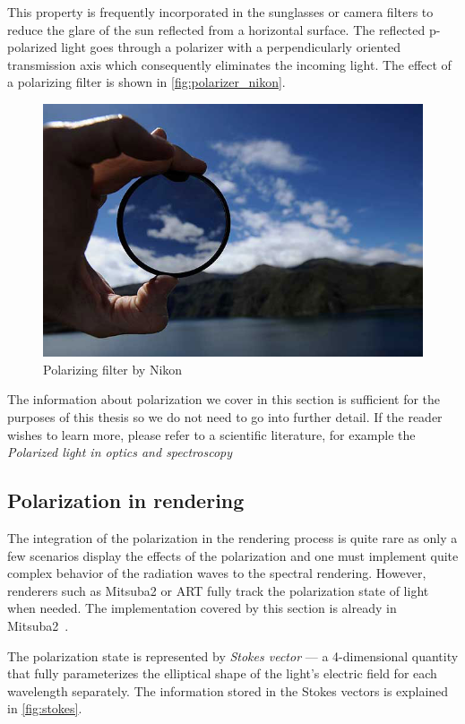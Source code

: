 This property is frequently incorporated in the sunglasses or camera filters to reduce the glare of the sun reflected from a horizontal surface. The reflected p-polarized light goes through a polarizer with a perpendicularly oriented transmission axis which consequently eliminates the incoming light. The effect of a polarizing filter is shown in \autoref{fig:polarizer_nikon}.

\begin{figure}[h]
	\centering
	\includegraphics[width=.7\linewidth]{img/polarizer_nikon.jpg}
	\caption[nikon]{Polarizing filter by Nikon\footnotemark}
	\label{fig:polarizer_nikon}
\end{figure}

The information about polarization we cover in this section is sufficient for the purposes of this thesis so we do not need to go into further detail. If the reader wishes to learn more, please refer to a scientific literature, for example the \emph{Polarized light in optics and spectroscopy}~\cite{kliger2012polarized}

\subsection{Polarization in rendering}
The integration of the polarization in the rendering process is quite rare as only a few scenarios display the effects of the polarization and one must implement quite complex behavior of the radiation waves to the spectral rendering. However, renderers such as Mitsuba2 or ART fully track the polarization state of light when needed. The implementation covered by this section is already in Mitsuba2~\cite{mitsubaWeb}.

The polarization state is represented by \emph{Stokes vector} --- a 4-dimensional quantity that fully parameterizes the elliptical shape of the light's electric field for each wavelength separately. The information stored in the Stokes vectors is explained in \autoref{fig:stokes}.

